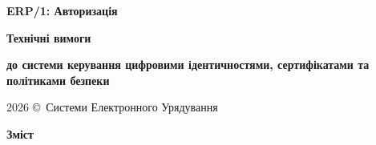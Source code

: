\documentclass{article}
\newcommand\HUGE[1]{\fontsize{40}{40}\selectfont #1}
\begin{document}
\pagestyle{fancy}

\begin{titlepage}
  \AddToShipoutPictureBG*{\AtPageLowerLeft{\color{nato}\rule{\paperwidth}{\paperheight}}}
  \color{white}\thispagestyle{empty}\vspace*{4cm}\centering
  {\Huge \textbf{ERP/1: Авторизація} \par} \vspace{2cm}
  {\HUGE \textbf{Технічні вимоги} \par} \vspace{2.5cm}
  {\LARGE \textbf{до системи керування цифровими ідентичностями, сертифікатами та політиками безпеки} \par} \vspace{2.5cm}
  \vfill
  {\large 2026 \copyright\ Системи Електронного Урядування \par}
\end{titlepage}

\newpage
\begin{center}{\Huge\color{nato}\bfseries Зміст\par}\end{center}
\vspace{40pt}
\tableofcontents

\begin{abstract}
ERP/1: Служба ідентифікації та авторизації (IAS) є центральним керуючим компонентом безпеки Zencrypted-середовища на базі Erlang/OTP. Поточна реалізація веде стійкий реєстр доменних об'єктів у KVS/Mnesia, підтримує граф зв'язків користувач--пристрій--сертифікат--профіль безпеки--VPN-сервіс, перевірку CSR і X.509, покрокове налаштування пристрою, доставку бажаного стану до VPN через Erlang RPC, ревізії, аудит доставки, звіряння стану та відновлення після збоїв. Інтеграція з CA у поточній версії містить перехідний CMP-шлях через зовнішній командний інтерфейс OpenSSL; цільовою є повне усунення запуску OpenSSL із середовища виконання IAS та взаємодія з CA через керований клієнт або сервісний адаптер. Вимоги щодо BPE/BPMN, EST/CMC, CRL/OCSP, КСЗІ, КЕП та національних криптографічних алгоритмів у цьому документі позначаються окремо як цільові або нормативні вимоги і не трактуються як уже реалізовані функції.
\end{abstract}

\newpage
\end{document}
